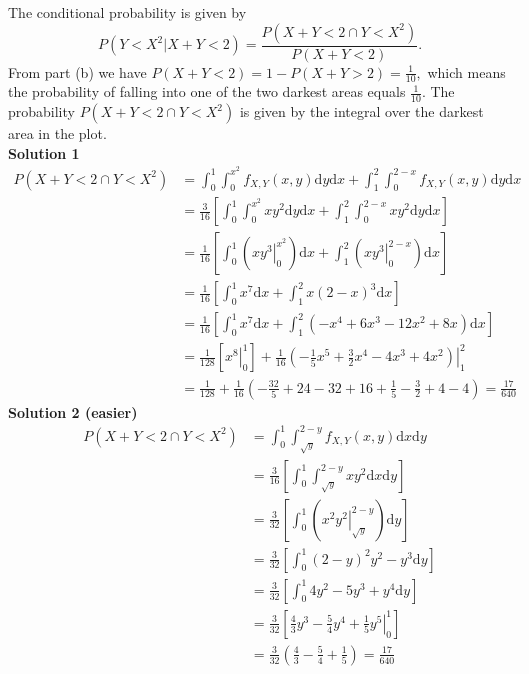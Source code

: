 \begin{exercise}
\begin{solution}
            The conditional probability is given by $$P(Y<X^2|X+Y<2) = \frac{P(X+Y<2\cap Y < X^2)}{P(X+Y<2)}.$$
            From part (b) we have $P(X+Y<2) = 1 - P(X+Y>2) = \frac{1}{10},$
            which means the probability of falling into one of the two darkest areas equals $\frac{1}{10}$. The probability $P(X+Y<2\cap Y < X^2)$ is given by the integral over the darkest area in the plot. \\
            \textbf{Solution 1}
            \begin{align*}
                P(X+Y<2\cap Y < X^2) &= \int_{0}^{1}\int_{0}^{x^2}f_{X,Y}(x,y)\text{d}y\text{d}x +\int_{1}^{2}\int_{0}^{2-x}f_{X,Y}(x,y)\text{d}y\text{d}x\\
                &= \frac{3}{16}\left[\int_{0}^{1}\int_{0}^{x^{2}}xy^2\text{d}y\text{d}x +\int_{1}^{2}\int_{0}^{2-x}xy^2\text{d}y\text{d}x\right]\\
                &= \frac{1}{16}\left[\int_{0}^{1}\left(\left.xy^3\right|_{0}^{x^{2}}\right)\text{d}x +\int_{1}^{2}\left(\left.xy^3\right|_{0}^{2-x}\right)\text{d}x\right]\\
                &= \frac{1}{16}\left[\int_{0}^{1}x^7\text{d}x +\int_{1}^{2}x(2-x)^3 \text{d}x\right]\\
                &= \frac{1}{16}\left[\int_{0}^{1}x^7\text{d}x +\int_{1}^{2}(-x^4+6x^3-12x^2+8x)\text{d}x\right]\\
                &= \frac{1}{128}\left[\left.x^8\right|_0^1\right] +\frac{1}{16}\left.\left(-\frac{1}{5}x^5+\frac{3}{2}x^4-4x^3+4x^2\right)\right|_{1}^{2}\\
                &= \frac{1}{128} + \frac{1}{16}\left(-\frac{32}{5}+24-32+16+\frac{1}{5}-\frac{3}{2}+4-4\right)= \frac{17}{640}
            \end{align*}
            \textbf{Solution 2 (easier)}
            \begin{align*}
                P(X+Y<2\cap Y < X^2) &= \int_{0}^{1}\int_{\sqrt{y}}^{2-y}f_{X,Y}(x,y)\text{d}x\text{d}y\\
                &= \frac{3}{16}\left[\int_{0}^{1}\int_{\sqrt{y}}^{2-y}xy^2\text{d}x\text{d}y\right]\\
                &= \frac{3}{32}\left[\int_{0}^{1}\left(\left.x^2y^2\right|_{\sqrt{y}}^{2-y}\right)\text{d}y\right]\\
                &= \frac{3}{32}\left[\int_{0}^{1}(2-y)^2 y^2 - y^3\text{d}y \right]\\
                &= \frac{3}{32}\left[\int_{0}^{1}4y^2-5y^3+y^4 \text{d}y\right]\\
                &= \frac{3}{32}\left[\left.\frac{4}{3}y^3-\frac{5}{4}y^4+\frac{1}{5}y^5\right|_0^1\right]\\
                &= \frac{3}{32}\left(\frac{4}{3}-\frac{5}{4}+\frac{1}{5}\right) = \frac{17}{640}
            \end{align*}


\end{solution}
\end{exercise}

